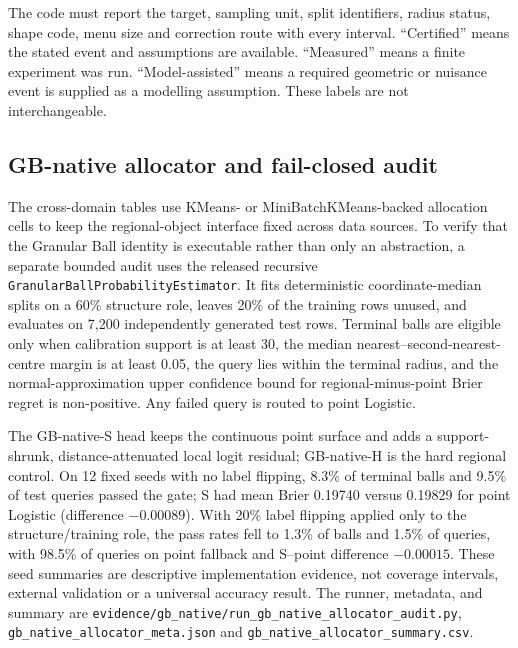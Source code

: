 \documentclass[11pt,a4paper]{article}
\numberwithin{equation}{section}
\theoremstyle{definition}\newtheorem{definition}[theorem]{Definition}
\theoremstyle{remark}\newtheorem{remark}[theorem]{Remark}
\begin{document}
The code must report the target, sampling unit, split identifiers, radius status, shape code, menu size and correction route with every interval. “Certified” means the stated event and assumptions are available. “Measured” means a finite experiment was run. “Model-assisted” means a required geometric or nuisance event is supplied as a modelling assumption. These labels are not interchangeable.


\subsection{GB-native allocator and fail-closed audit}\label{sec:gb_native_audit}
The cross-domain tables use KMeans- or MiniBatchKMeans-backed allocation cells to keep the regional-object interface fixed across data sources. To verify that the Granular Ball identity is executable rather than only an abstraction, a separate bounded audit uses the released recursive \texttt{GranularBallProbabilityEstimator}. It fits deterministic coordinate-median splits on a 60\% structure role, leaves 20\% of the training rows unused, and evaluates on 7,200 independently generated test rows. Terminal balls are eligible only when calibration support is at least 30, the median nearest--second-nearest-centre margin is at least 0.05, the query lies within the terminal radius, and the normal-approximation upper confidence bound for regional-minus-point Brier regret is non-positive. Any failed query is routed to point Logistic.

The GB-native-S head keeps the continuous point surface and adds a support-shrunk, distance-attenuated local logit residual; GB-native-H is the hard regional control. On 12 fixed seeds with no label flipping, 8.3\% of terminal balls and 9.5\% of test queries passed the gate; S had mean Brier 0.19740 versus 0.19829 for point Logistic (difference $-0.00089$). With 20\% label flipping applied only to the structure/training role, the pass rates fell to 1.3\% of balls and 1.5\% of queries, with 98.5\% of queries on point fallback and S--point difference $-0.00015$. These seed summaries are descriptive implementation evidence, not coverage intervals, external validation or a universal accuracy result. The runner, metadata, and summary are \texttt{evidence/gb\_native/run\_gb\_native\_allocator\_audit.py}, \texttt{gb\_native\_allocator\_meta.json} and \texttt{gb\_native\_allocator\_summary.csv}.
\end{document}
